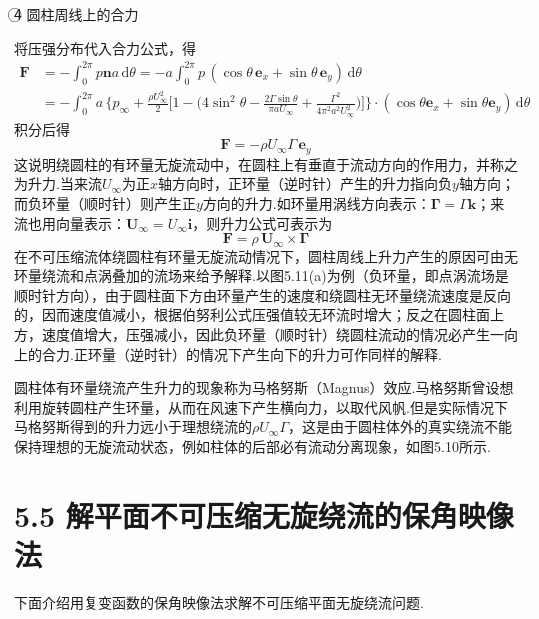 \textcircled{4} 圆柱周线上的合力

将压强分布代入合力公式，得
\begin{align*}
\boldsymbol{F}&=-\int_0^{2\pi}p\boldsymbol{n}a\,\mathrm{d}\theta=-a\int_0^{2\pi}p\,(\cos\theta\,\boldsymbol{e}_x+\sin\theta\,\boldsymbol{e}_y)\,\mathrm{d}\theta\\
&=-\int_0^{2\pi}a\,\bigg\{p_\infty+\frac{\rho U_\infty^{2}}{2}\bigg[1-\Big(4\sin^{2}\theta-\frac{2\Gamma\sin\theta}{\pi aU_\infty}+\frac{\Gamma^{2}}{4\pi^{2}a^{2}U_\infty^{2}}\Big)\bigg]\bigg\}\cdot(\cos\theta\boldsymbol{e}_x+\sin\theta\boldsymbol{e}_y)\,\mathrm{d}\theta
\end{align*}
积分后得
\begin{equation*}
\boldsymbol{F}=-\rho U_\infty\Gamma\,\boldsymbol{e}_y
\tag{5.65}
\end{equation*}
这说明绕圆柱的有环量无旋流动中，在圆柱上有垂直于流动方向的作用力，并称之为升力.当来流$U_\infty$为正$x$轴方向时，正环量（逆时针）产生的升力指向负$y$轴方向；而负环量（顺时针）则产生正$y$方向的升力.如环量用涡线方向表示：$\boldsymbol{\Gamma}=\Gamma\boldsymbol{k}$；来流也用向量表示：$\boldsymbol{U}_\infty=U_\infty\boldsymbol{i}$，则升力公式可表示为
\begin{equation*}
\boldsymbol{F}=\rho\,\boldsymbol{U}_\infty\times\boldsymbol{\Gamma}
\tag{5.66}
\end{equation*}
在不可压缩流体绕圆柱有环量无旋流动情况下，圆柱周线上升力产生的原因可由无环量绕流和点涡叠加的流场来给予解释.以图5.11(a)为例（负环量，即点涡流场是顺时针方向），由于圆柱面下方由环量产生的速度和绕圆柱无环量绕流速度是反向的，因而速度值减小，根据伯努利公式压强值较无环流时增大；反之在圆柱面上方，速度值增大，压强减小，因此负环量（顺时针）绕圆柱流动的情况必产生一向上的合力.正环量（逆时针）的情况下产生向下的升力可作同样的解释.

圆柱体有环量绕流产生升力的现象称为马格努斯（Magnus）效应.马格努斯曾设想利用旋转圆柱产生环量，从而在风速下产生横向力，以取代风帆.但是实际情况下马格努斯得到的升力远小于理想绕流的$\rho U_\infty\Gamma$，这是由于圆柱体外的真实绕流不能保持理想的无旋流动状态，例如柱体的后部必有流动分离现象，如图5.10所示.

\section*{5.5  解平面不可压缩无旋绕流的保角映像法}

下面介绍用复变函数的保角映像法求解不可压缩平面无旋绕流问题.


